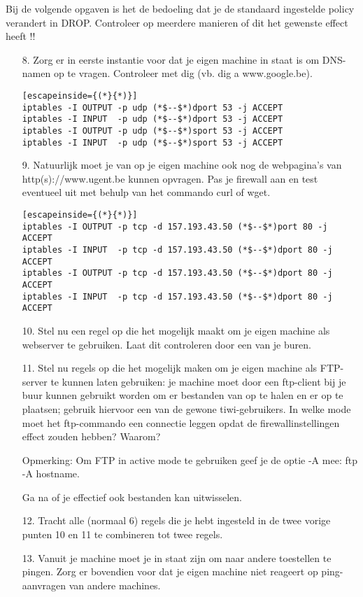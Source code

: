 \documentclass{report}
\begin{document}
Bij de volgende opgaven is het de bedoeling dat je de standaard ingestelde policy verandert in DROP.
Controleer op meerdere manieren of dit het gewenste effect heeft !!
\begin{enumerate}
	\item[8.]    Zorg er in eerste instantie voor dat je eigen machine in staat is om DNS-namen op te vragen. Controleer met dig (vb. dig a www.google.be).
	\begin{lstlisting}[escapeinside={(*}{*)}]
iptables -I OUTPUT -p udp (*$--$*)dport 53 -j ACCEPT
iptables -I INPUT  -p udp (*$--$*)dport 53 -j ACCEPT
iptables -I OUTPUT -p udp (*$--$*)sport 53 -j ACCEPT
iptables -I INPUT  -p udp (*$--$*)sport 53 -j ACCEPT
	\end{lstlisting}
	\item[9.]  Natuurlijk moet je van op je eigen machine ook nog de webpagina's van http(s)://www.ugent.be kunnen opvragen. Pas je firewall aan en test eventueel uit met behulp van het commando curl of wget.
	\begin{lstlisting}[escapeinside={(*}{*)}]
iptables -I OUTPUT -p tcp -d 157.193.43.50 (*$--$*)port 80 -j ACCEPT
iptables -I INPUT  -p tcp -d 157.193.43.50 (*$--$*)dport 80 -j ACCEPT
iptables -I OUTPUT -p tcp -d 157.193.43.50 (*$--$*)dport 80 -j ACCEPT
iptables -I INPUT  -p tcp -d 157.193.43.50 (*$--$*)dport 80 -j ACCEPT
	\end{lstlisting}
	\item[10.]    Stel nu een regel op die het mogelijk maakt om je eigen machine als webserver te gebruiken. Laat dit controleren door een van je buren.

	\item[11.]    Stel nu regels op die het mogelijk maken om je eigen machine als FTP-server te kunnen laten gebruiken: je machine moet door een ftp-client bij je buur kunnen gebruikt worden om er bestanden van op te halen en er op te plaatsen; gebruik hiervoor een van de gewone tiwi-gebruikers.
    In welke mode moet het ftp-commando een connectie leggen opdat de firewallinstellingen effect zouden hebben? Waarom?

    Opmerking: Om FTP in active mode te gebruiken geef je de optie -A mee: ftp -A hostname.

    Ga na of je effectief ook bestanden kan uitwisselen.
	\item[12.]     Tracht alle (normaal 6) regels die je hebt ingesteld in de twee vorige punten 10 en 11 te combineren tot twee regels.

	\item[13.]    Vanuit je machine moet je in staat zijn om naar andere toestellen te pingen. Zorg er bovendien voor dat je eigen machine niet reageert op ping-aanvragen van andere machines.
\end{enumerate}
\end{document}
